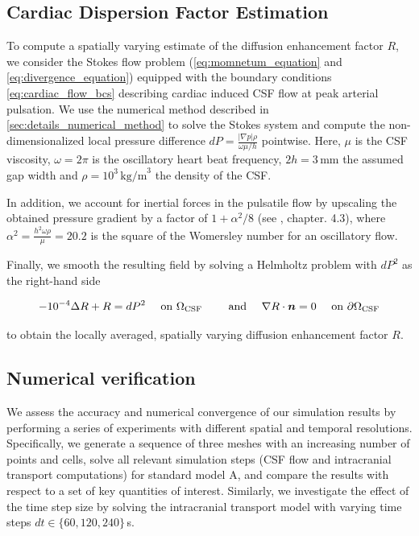 \documentclass[fleqn,10pt]{wlscirep}
\begin{document}
\subsection{Cardiac Dispersion Factor Estimation}\label{sec:dispersion_details}

To compute a spatially varying estimate of the diffusion enhancement factor $R$, we consider the Stokes flow problem (\cref{eq:momnetum_equation} and \cref{eq:divergence_equation}) equipped with the boundary conditions \cref{eq:cardiac_flow_bcs} describing cardiac induced CSF flow at peak arterial pulsation. We use the numerical method described in \cref{sec:details_numerical_method} to solve the Stokes system and compute the non-dimensionalized local pressure difference $dP=\frac{|\nabla p| \rho}{\omega \mu / h}$ pointwise. Here, $\mu$ is the CSF viscosity, $\omega = 2 \pi$ is the oscillatory heart beat frequency, $2h=3$\,mm the assumed gap width and $\rho=10^3\,\text{kg/m}^3$ the density of the CSF.

In addition, we account for inertial forces in the pulsatile flow by upscaling the obtained pressure gradient by a factor of $1 + \alpha^2 / 8$ (see \cite{van1998cardiovascular}, chapter. 4.3), where $\alpha^2 = \frac{h^2 \omega \rho}{\mu} = 20.2$ is the square of the Womersley number for an oscillatory flow.

Finally, we smooth the resulting field by solving a Helmholtz problem with $dP^2$ as the right-hand side

\begin{equation}
- 10^{-4} \Delta R + R = dP^2 \quad \text{ on } \Omega_{\rm CSF} \qquad \text{ and } \quad \nabla R \cdot \bm n = 0 \quad \text{ on } \partial \Omega_{\rm CSF}
\end{equation}

to obtain the locally averaged, spatially varying diffusion enhancement factor $R$.

\subsection{Numerical verification}

We assess the accuracy and numerical convergence of our simulation results by performing a series of experiments with different spatial and temporal resolutions. Specifically, we generate a sequence of three meshes with an increasing number of points and cells, solve all relevant simulation steps (CSF flow and intracranial transport computations) for standard model A, and compare the results with respect to a set of key quantities of interest. Similarly, we investigate the effect of the time step size by solving the intracranial transport model with varying time steps $dt \in \{60, 120, 240 \}$\,s.
\end{document}
